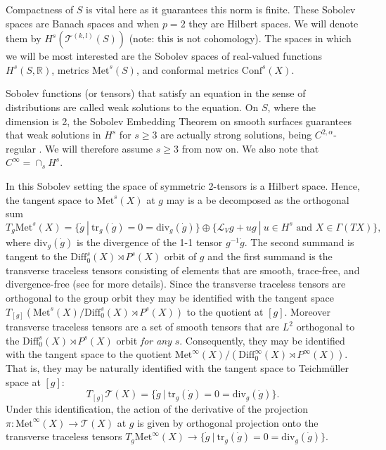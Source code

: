 \documentclass{amsart}
\newcommand{\R}{\mathbb{R}}
\begin{document}
Compactness of $S$ is vital here as it guarantees this norm is finite. 
These Sobolev spaces are Banach spaces and when $p = 2$ they are Hilbert spaces. 
We will denote them by $H^s(\mathscr{T}^{(k,l)}(S))$ (note: this is not cohomology). 
The spaces in which we will be most interested are the Sobolev spaces of real-valued functions $H^s(S,\R)$, metrics $\mathrm{Met}^s(S)$, and conformal metrics $\mathrm{Conf}^s(X)$.

Sobolev functions (or tensors) that satisfy an equation in the sense of distributions are called weak solutions to the equation. 
On $S$, where the dimension is 2, the Sobolev Embedding Theorem on smooth surfaces guarantees that weak solutions in $H^s$ for $s \geq 3$ are actually strong solutions, being $C^{2,\alpha}$-regular \cite{aubin1982}. 
We will therefore assume $s \geq 3$ from now on. 
We also note that $C^\infty = \cap_s H^s$.


In this Sobolev setting the space of symmetric 2-tensors is a Hilbert space. Hence, the tangent space to $\mathrm{Met}^s(X)$ at $g$ may is a be decomposed as the orthogonal sum
\[
T_g \mathrm{Met}^s(X) = \{\dot{g} \ | \ \mathrm{tr}_g (\dot{g}) = 0 = \mathrm{div}_g(\dot{g}) \} \oplus \{\mathcal{L}_V g + ug \ |\ u \in H^s \text{ and } X \in \Gamma(TX) \},
\] 
where $\mathrm{div}_g(\dot{g})$ is the divergence of the 1-1 tensor $g^{-1}\dot{g}$. 
The second summand is tangent to the $\mathrm{Diff}_0^s(X) \rtimes P^s(X)$ orbit of $g$ and the first summand is the transverse traceless tensors consisting of elements that are smooth, trace-free, and divergence-free (see \cite{fischer-marsden1975} for more details). 
Since the transverse traceless tensors are orthogonal to the group orbit they may be identified with the tangent space $T_{[g]} \left( \mathrm{Met}^s(X)/ \mathrm{Diff}_0^s(X) \rtimes P^s(X) \right)$ to the quotient at $[g]$. 
Moreover transverse traceless tensors are a set of smooth tensors that are $L^2$ orthogonal to the $\mathrm{Diff}_0^s(X) \rtimes P^s(X)$ orbit \textit{for any} $s$. 
Consequently, they may be identified with the tangent space to the quotient $\mathrm{Met}^\infty(X)/(\mathrm{Diff}_0^\infty(X) \rtimes P^\infty(X))$. 
That is, they may be naturally identified with the tangent space to Teichm\"uller space at $[g]$:
\[
T_{[g]} \mathcal{T}(X) = \{\dot{g} \ | \ \mathrm{tr}_g (\dot{g}) = 0 = \mathrm{div}_g(\dot{g}) \}.
\]
Under this identification, the action of the derivative of the projection $\pi: \mathrm{Met}^\infty(X) \to \mathcal{T}(X)$ at $g$ is given by orthogonal projection onto the transverse traceless tensors $T_g \mathrm{Met}^\infty(X) \to \{\dot{g} \ | \ \mathrm{tr}_g (\dot{g}) = 0 = \mathrm{div}_g(\dot{g}) \}$.
\end{document}
